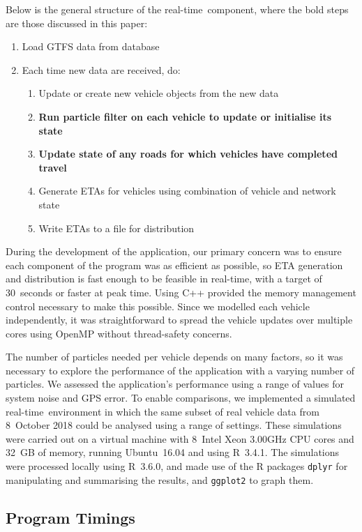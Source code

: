 \documentclass[times, doublespace]{anzsauth}
\newcommand{\rt}{real-time\ }
\begin{document}
Below is the general structure of the \rt component,
where the bold steps are those discussed in this paper:
\begin{enumerate}
\item Load GTFS data from database
\item Each time new data are received, do:
\begin{enumerate}
    \item Update or create new vehicle objects from the new data
    \item \textbf{Run particle filter on each vehicle to update or initialise its state}
    \item \textbf{Update state of any roads for which vehicles
        have completed travel}
    \item Generate ETAs for vehicles using combination of vehicle and network state
    \item Write ETAs to a file for distribution
\end{enumerate}
\end{enumerate}


During the development of the application,
our primary concern was to ensure each component of the program
was as efficient as possible,
so ETA generation and distribution is fast enough to be feasible in real-time,
with a target of 30~seconds or faster at peak time.
Using \textsf{C++} provided the memory management control necessary to make this possible.
Since we modelled each vehicle independently,
it was straightforward to spread the vehicle updates
over multiple cores using \textsf{OpenMP} without thread-safety concerns.


The number of particles needed per vehicle
depends on many factors,
so it was necessary to explore the performance of the application
with a varying number of particles.
We assessed the application's performance
using a range of values for
system noise and GPS error.
To enable comparisons, we implemented a simulated \rt environment
in which the same subset of real vehicle data from 8~October 2018
could be analysed using a range of settings.
These simulations were carried out on a virtual machine
with 8~Intel Xeon 3.00GHz CPU cores and 32~GB of memory,
running \textsf{Ubuntu}~16.04 and using \textsf{R}~3.4.1.
The simulations were processed locally using \textsf{R}~3.6.0,
and made use of the \textsf{R} packages \verb+dplyr+ \citep{dplyr}
for manipulating and summarising the results,
and \verb+ggplot2+ \citep{ggplot2} to graph them.


\subsection{Program Timings}
\label{sec:timings}
\end{document}
